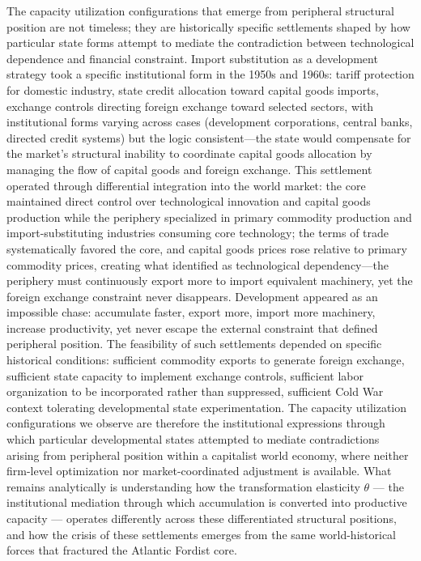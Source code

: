 The capacity utilization configurations that emerge from peripheral structural position are not timeless; they are historically specific settlements shaped by how particular state forms attempt to mediate the contradiction between technological dependence and financial constraint. Import substitution as a development strategy took a specific institutional form in the 1950s and 1960s: tariff protection for domestic industry, state credit allocation toward capital goods imports, exchange controls directing foreign exchange toward selected sectors, with institutional forms varying across cases (development corporations, central banks, directed credit systems) but the logic consistent—the state would compensate for the market's structural inability to coordinate capital goods allocation by managing the flow of capital goods and foreign exchange. This settlement operated through differential integration into the world market: the core maintained direct control over technological innovation and capital goods production while the periphery specialized in primary commodity production and import-substituting industries consuming core technology; the terms of trade systematically favored the core, and capital goods prices rose relative to primary commodity prices, creating what \citet{Prebisch1981} identified as technological dependency—the periphery must continuously export more to import equivalent machinery, yet the foreign exchange constraint never disappears. Development appeared as an impossible chase: accumulate faster, export more, import more machinery, increase productivity, yet never escape the external constraint that defined peripheral position. The feasibility of such settlements depended on specific historical conditions: sufficient commodity exports to generate foreign exchange, sufficient state capacity to implement exchange controls, sufficient labor organization to be incorporated rather than suppressed, sufficient Cold War context tolerating developmental state experimentation. The capacity utilization configurations we observe are therefore the institutional expressions through which particular developmental states attempted to mediate contradictions arising from peripheral position within a capitalist world economy, where neither firm-level optimization nor market-coordinated adjustment is available. What remains analytically is understanding how the transformation elasticity $\theta$ — the institutional mediation through which accumulation is converted into productive capacity — operates differently across these differentiated structural positions, and how the crisis of these settlements emerges from the same world-historical forces that fractured the Atlantic Fordist core.

